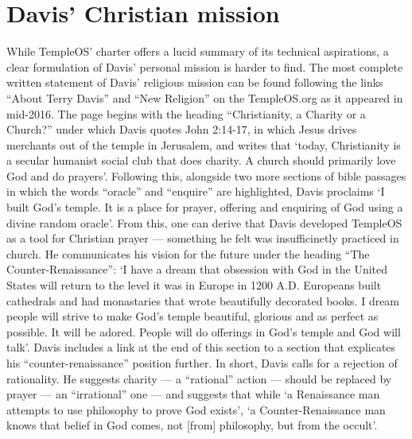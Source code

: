 \documentclass[Draft.tex]{subfiles}
\begin{document}
\section*{Davis' Christian mission}
While TempleOS' charter offers a lucid summary of its technical aspirations,
a clear formulation of Davis' personal mission is harder to find.
The most complete written statement of Davis' religious mission can be found
following the links ``About Terry Davis'' and ``New Religion'' on the
TempleOS.org as it appeared in mid-2016.
The page begins with the heading ``Christianity, a Charity or a Church?''
under which Davis \parencite*{NewReligionSite} quotes John 2:14-17, in which
Jesus drives merchants out of the temple in Jerusalem,
and writes that `today, Christianity is a secular humanist social club
that does charity.  A church should primarily love God and do prayers'.
Following this, alongside two more sections of bible passages in which
the words ``oracle'' and ``enquire'' are highlighted,
Davis proclaims `I built God's temple.  It is a place for prayer, offering and
enquiring of God using a divine random oracle'.
From this, one can derive that Davis developed TempleOS as a tool for
Christian prayer --- something he felt was insufficinetly practiced in church.
He communicates his vision for the future under the heading
``The Counter-Renaissance'':
`I have a dream that obsession with God in the United States
will return to the level it was in Europe in 1200 A.D.
Europeans built cathedrals and had monastaries
that wrote beautifully decorated books.
I dream people will strive to make God's temple beautiful, glorious
and as perfect as possible.  It will be adored.
People will do offerings in God's temple and God will talk'.
Davis includes a link at the end of this section to a section that
explicates his ``counter-renaissance'' position further.
In short, Davis calls for a rejection of rationality.
He suggests charity --- a ``rational'' action ---
should be replaced by prayer --- an ``irrational'' one ---
and suggests that while `a Renaissance man
attempts to use philosophy to prove God exists',
`a Counter-Renaissance man knows that belief in God comes,
not [from] philosophy, but from the occult'.


\end{document}
